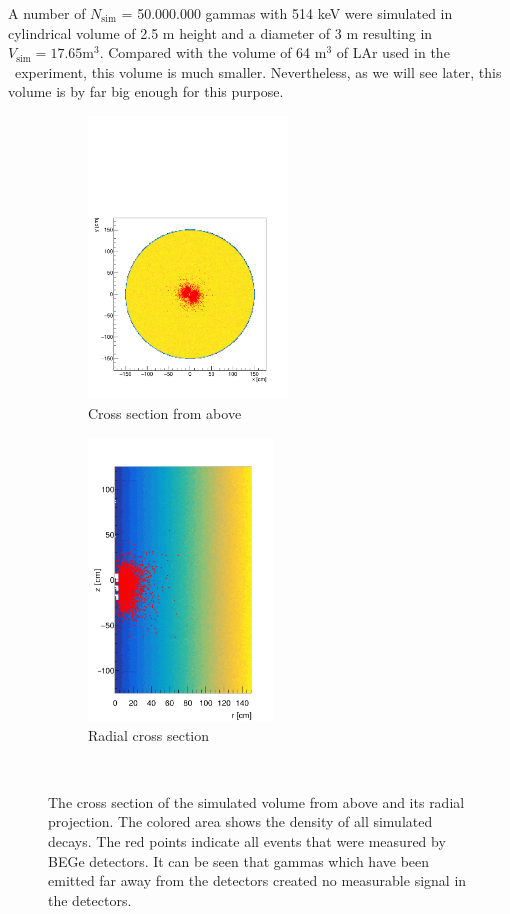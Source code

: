 \documentclass[encoding=utf8,british]{tumphthesis}
\begin{document}
A number of $N_{\mathrm{sim}}$ = 50.000.000 gammas with 514 keV were simulated in cylindrical volume of 2.5 m height and a diameter of 3 m resulting in $V_{\mathrm{sim}} = 17.65 \mathrm{m}^3$.
Compared with the volume of 64 m\(^3\) of LAr used in the \gerda\ experiment, this volume is much smaller.
Nevertheless, as we will see later, this volume is by far big enough for this purpose.
\\

\begin{figure}[t!]
	\centering
	\begin{subfigure}{.5\textwidth}
		\centering
		\includegraphics[height=75mm]{./Bilder/MC-Querschnitt-BEGes.pdf}
		\caption{Cross section from above}
		\label{fig:CrossSecAb}
	\end{subfigure}\hfill%
	\begin{subfigure}{.5\textwidth}
		\centering
		\includegraphics[height=75mm]{./Bilder/MC-Radius-BEGes.png}
		\caption{Radial cross section}
		\label{fig:CrossSecRa}
	\end{subfigure}
    \\
	\vspace{0.5cm}
    \caption{
    	The cross section of the simulated volume from above and its radial projection.
    	The colored area shows the density of all simulated decays. 
    	The red points indicate all events that were measured by BEGe detectors.
    	It can be seen that gammas which have been emitted far away from the detectors created no measurable signal in the detectors.
    	}
\vspace{0.5cm}
\end{figure}
\\
\end{document}
